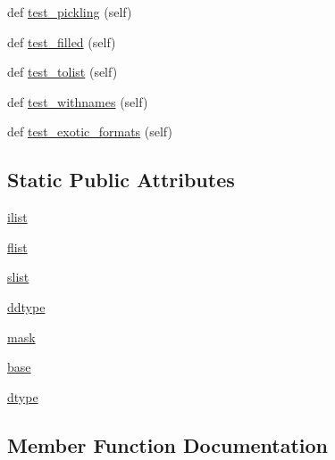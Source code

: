 \begin{DoxyCompactItemize}
\item 
def \hyperlink{classnumpy_1_1ma_1_1tests_1_1test__mrecords_1_1TestMRecords_ad4a80fcbfcea6c84779cc8af2a75f823}{test\+\_\+pickling} (self)
\item 
def \hyperlink{classnumpy_1_1ma_1_1tests_1_1test__mrecords_1_1TestMRecords_a48f0294c0b1c4768f43872b25a99eba7}{test\+\_\+filled} (self)
\item 
def \hyperlink{classnumpy_1_1ma_1_1tests_1_1test__mrecords_1_1TestMRecords_aae1e79eaee252c989967a120023062c9}{test\+\_\+tolist} (self)
\item 
def \hyperlink{classnumpy_1_1ma_1_1tests_1_1test__mrecords_1_1TestMRecords_a300c7f0e17defe5d3d69ccf47305eb8a}{test\+\_\+withnames} (self)
\item 
def \hyperlink{classnumpy_1_1ma_1_1tests_1_1test__mrecords_1_1TestMRecords_af5006ce9f345551fc4e4160e69458dc6}{test\+\_\+exotic\+\_\+formats} (self)
\end{DoxyCompactItemize}
\subsection*{Static Public Attributes}
\begin{DoxyCompactItemize}
\item 
\hyperlink{classnumpy_1_1ma_1_1tests_1_1test__mrecords_1_1TestMRecords_a427cba0213791a52468bec7b5d5f0687}{ilist}
\item 
\hyperlink{classnumpy_1_1ma_1_1tests_1_1test__mrecords_1_1TestMRecords_a8c74ee6bd3c4117b16407ab2803e3ad1}{flist}
\item 
\hyperlink{classnumpy_1_1ma_1_1tests_1_1test__mrecords_1_1TestMRecords_ab4dc7410da3d8144f31565896eec09b8}{slist}
\item 
\hyperlink{classnumpy_1_1ma_1_1tests_1_1test__mrecords_1_1TestMRecords_ae4cd8e343d4eb45f26708fe5ce0f9e3e}{ddtype}
\item 
\hyperlink{classnumpy_1_1ma_1_1tests_1_1test__mrecords_1_1TestMRecords_ab7bf4987ef80bef7f8ec8b11cac7d1f5}{mask}
\item 
\hyperlink{classnumpy_1_1ma_1_1tests_1_1test__mrecords_1_1TestMRecords_ab4202a8aba81d75a3ab7291599de2fdd}{base}
\item 
\hyperlink{classnumpy_1_1ma_1_1tests_1_1test__mrecords_1_1TestMRecords_a6c83d5b9ef20e22ae548c70c0a0f40db}{dtype}
\end{DoxyCompactItemize}


\subsection{Member Function Documentation}
\mbox{\label{classnumpy_1_1ma_1_1tests_1_1test__mrecords_1_1TestMRecords_a5d3a4b4c4b29ed1b4adbedf41bac151e}} 
